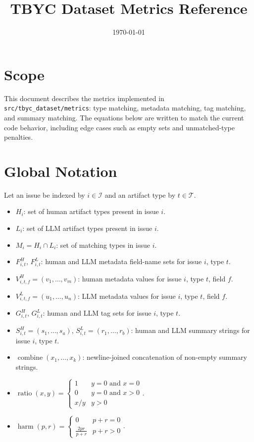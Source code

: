 \documentclass[11pt]{article}
\title{TBYC Dataset Metrics Reference}
\author{}
\date{\today}
\begin{document}
\maketitle

\section{Scope}
This document describes the metrics implemented in \texttt{src/tbyc\_dataset/metrics}: type matching, metadata matching, tag matching, and summary matching. The equations below are written to match the current code behavior, including edge cases such as empty sets and unmatched-type penalties.

\section{Global Notation}
Let an issue be indexed by $i \in \mathcal{I}$ and an artifact type by $t \in \mathcal{T}$.

\begin{itemize}[leftmargin=*]
\item $H_i$: set of human artifact types present in issue $i$.
\item $L_i$: set of LLM artifact types present in issue $i$.
\item $M_i = H_i \cap L_i$: set of matching types in issue $i$.
\item $F_{i,t}^{H}$, $F_{i,t}^{L}$: human and LLM metadata field-name sets for issue $i$, type $t$.
\item $V_{i,t,f}^{H} = (v_1,\dots,v_m)$: human metadata values for issue $i$, type $t$, field $f$.
\item $V_{i,t,f}^{L} = (u_1,\dots,u_n)$: LLM metadata values for issue $i$, type $t$, field $f$.
\item $G_{i,t}^{H}$, $G_{i,t}^{L}$: human and LLM tag sets for issue $i$, type $t$.
\item $S_{i,t}^{H} = (s_1,\dots,s_a)$, $S_{i,t}^{L} = (r_1,\dots,r_b)$: human and LLM summary strings for issue $i$, type $t$.
\item $\operatorname{combine}(x_1,\dots,x_k)$: newline-joined concatenation of non-empty summary strings.
\item $\operatorname{ratio}(x,y)=\begin{cases}1 & y=0 \text{ and } x=0\\0 & y=0 \text{ and } x>0\\x/y & y>0\end{cases}$.
\item $\operatorname{harm}(p,r)=\begin{cases}0 & p+r=0\\ \frac{2pr}{p+r} & p+r>0\end{cases}$.
\end{itemize}
\end{document}
